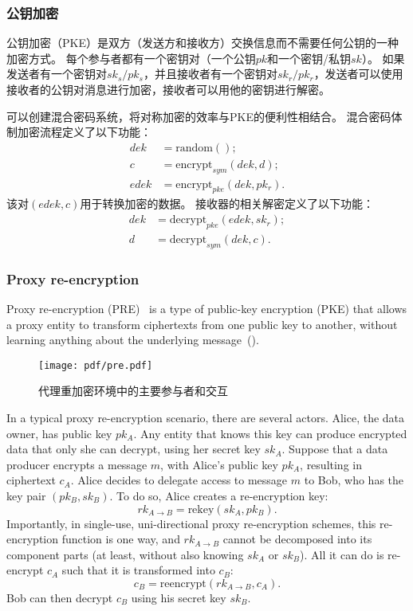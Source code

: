 \documentclass[longbibliography,nofootinbib]{revtex4-1}
\begin{document}
\begin{CJK*}{UTF8}{gbsn}
\subsubsection{公钥加密}

公钥加密（PKE）是双方（发送方和接收方）交换信息而不需要任何公钥的一种加密方式。
每个参与者都有一个密钥对（一个公钥$pk$和一个密钥/私钥$sk$）。
如果发送者有一个密钥对$sk_s/pk_s$，并且接收者有一个密钥对$sk_r/pk_r$，发送者可以使用接收者的公钥对消息进行加密，接收者可以用他的密钥进行解密。

可以创建混合密码系统，将对称加密的效率与PKE的便利性相结合。
混合密码体制加密流程定义了以下功能：
\begin{align}
    dek &= \text{random}();\\
    c &= \text{encrypt}_{sym}(dek, d);\\
    edek &= \text{encrypt}_{pke}(dek, pk_r).
\end{align}
该对$(edek,c)$用于转换加密的数据。
接收器的相关解密定义了以下功能：
\begin{align}
    dek &= \text{decrypt}_{pke}(edek, sk_r);\\
    d &= \text{decrypt}_{sym}(dek, c).
\end{align}

\subsubsection{Proxy re-encryption}
Proxy re-encryption (PRE)~\cite{wiki:pre,nunez2017proxy} is a type of public-key encryption (PKE) that allows a proxy entity to transform ciphertexts
from one public key to another, without learning anything about the underlying message~().

\begin{figure}
\centering
    \texttt{[image: pdf/pre.pdf]}
    \caption{代理重加密环境中的主要参与者和交互}
    \label{fig:pre}
\end{figure}

In a typical proxy re-encryption scenario, there are several actors.
Alice, the data owner, has public key $pk_A$. Any entity that knows this key can produce encrypted data that only she can decrypt, using her secret key $sk_A$.
Suppose that a data producer encrypts a message $m$, with Alice's public key $pk_A$,
resulting in ciphertext $c_A$.
Alice decides to delegate access to message $m$ to Bob, who has the key pair $(pk_B, sk_B)$.
To do so, Alice creates a re-encryption key:
\begin{equation}
    rk_{A\rightarrow B} = \text{rekey}(sk_A, pk_B).
\end{equation}
Importantly, in single-use, uni-directional proxy re-encryption schemes, this re-encryption function is one way, and $rk_{A\rightarrow B}$ cannot be decomposed into its component parts
(at least, without also knowing $sk_A$ or $sk_B$).
All it can do is re-encrypt $c_A$ such that it is transformed into $c_B$:
\begin{equation}
    c_B = \text{reencrypt}(rk_{A\rightarrow B}, c_{A}).
\end{equation}
Bob can then decrypt $c_{B}$ using his secret key $sk_{B}$.


\end{CJK*}
\end{document}
